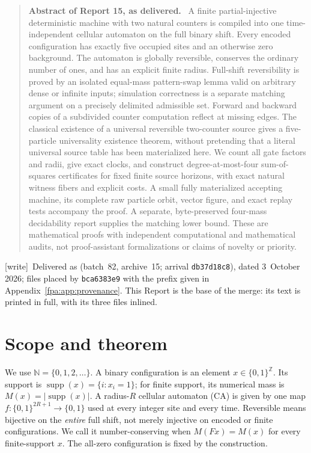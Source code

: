 \documentclass[11pt,a4paper]{article}
\numberwithin{equation}{section}
\newcommand{\N}{\mathbb N}\newcommand{\Z}{\mathbb Z}\newcommand{\R}{\mathbb R}
\newcommand{\supp}{\operatorname{supp}}\newcommand{\Swap}{\operatorname{Swap}}
\newcommand{\wtag}{\textup{[write]}}
\newenvironment{reportabstract}[1]{\begin{quote}\small\textbf{Abstract of Report #1, as delivered.}\ }{\end{quote}}
\begin{document}
\begin{reportabstract}{15}
A finite partial-injective deterministic machine with two natural counters is
compiled into one time-independent cellular automaton on the full binary shift.
Every encoded configuration has exactly five occupied sites and an otherwise
zero background. The automaton is globally reversible, conserves the ordinary
number of ones, and has an explicit finite radius. Full-shift reversibility is
proved by an isolated equal-mass pattern-swap lemma valid on arbitrary dense or
infinite inputs; simulation correctness is a separate matching argument on a
precisely delimited admissible set. Forward and backward copies of a subdivided
counter computation reflect at missing edges. The classical existence of a
universal reversible two-counter source gives a five-particle universality
existence theorem, without pretending that a literal universal source table has
been materialized here. We count all gate factors and radii, give exact clocks,
and construct degree-at-most-four sum-of-squares certificates for fixed finite
source horizons, with exact natural witness fibers and explicit costs. A small
fully materialized accepting machine, its complete raw particle orbit, vector
figure, and exact replay tests accompany the proof. A separate, byte-preserved
four-mass decidability report supplies the matching lower bound. These are
mathematical proofs with independent computational and mathematical audits,
not proof-assistant formalizations or claims of novelty or priority.
\end{reportabstract}

\wtag\ Delivered as  (batch~82, archive~15; arrival \texttt{db37d18c8}), dated 3~October 2026; files placed by \texttt{bca6383e9} with the prefix given in Appendix~\ref{fpa:app:provenance}. This Report is the base of the merge: its text is printed in full, with its three \verb|| files inlined.

\section{Scope and theorem}\label{fpa:rep:15:first}
We use $\N=\{0,1,2,\ldots\}$. A binary configuration is an element
$x\in\{0,1\}^{\Z}$. Its support is $\supp(x)=\{i:x_i=1\}$; for finite support,
its numerical mass is $M(x)=|\supp(x)|$. A radius-$R$ cellular automaton (CA) is
given by one map $f:\{0,1\}^{2R+1}\to\{0,1\}$ used at every integer site and
every time. Reversible means bijective on the \emph{entire} full shift, not
merely injective on encoded or finite configurations. We call it
number-conserving when $M(Fx)=M(x)$ for every finite-support $x$. The all-zero
configuration is fixed by the construction.
\end{document}
